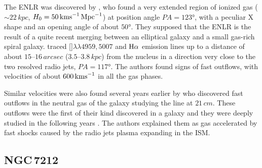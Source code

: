 \documentclass[../thesis.tex]{subfiles}
\begin{document}
The ENLR was discovered by \citet{Colina91}, who found a very extended region of ionized gas ($\sim 22\,\si{kpc}$, $H_0 =50\,\si{\kms.Mpc^{-1}}$) at position angle $PA = \ang{123}$, with a peculiar X shape and an opening angle of about $\ang{50}$. 
They supposed that the ENLR is the result of a quite recent merging between an elliptical galaxy and a small gas-rich spiral galaxy. 
\citet{Morganti07} traced []$\lambda\lambda4959, 5007$ and $\Ha$ emission lines up to a distance of about $15$--$16\,\si{arcsec}$ ($3.5$--$3.8\,\si{kpc}$) from the nucleus in a direction very close to the two resolved radio jets, $PA = \ang{117}$. 
The authors found signs of fast outflows, with velocities of about $600\,\si{\kms}$ in all the gas phases.

Similar velocities were also found several years earlier by \citet{Morganti98} who discovered fast outflows in the neutral gas of the galaxy studying the  line at $21\,\si{cm}$.
These outflows were the first of their kind discovered in a galaxy and they were deeply studied in the following years \citep{Morganti07,Tadhunter14,Morganti15}.
The authors explained them as gas accelerated by fast shocks caused by the radio jets plasma expanding in the ISM.


\subsection{NGC\,7212}
\label{sec:NGC7212}
\end{document}
